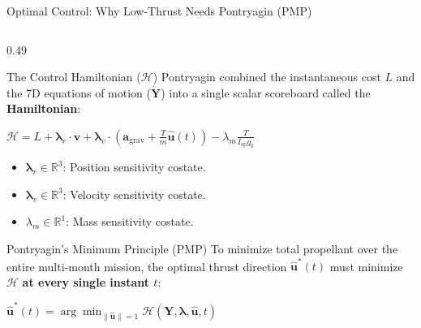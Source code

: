\documentclass[aspectratio=169, 10pt]{beamer}
\begin{document}
\begin{frame}{Optimal Control: Why Low-Thrust Needs Pontryagin (PMP)}
\begin{columns}[T]
        \begin{column}{0.49\textwidth}
            \begin{block}{The Control Hamiltonian ($\mathcal{H}$)}
                \scriptsize
                Pontryagin combined the instantaneous cost $L$ and the 7D equations of motion ($\dot{\mathbf{Y}}$) into a single scalar scoreboard called the \textbf{Hamiltonian}:
                \par\vspace{2pt}
                {\centering $\displaystyle \mathcal{H} = L + \boldsymbol{\lambda}_r \cdot \mathbf{v} + \boldsymbol{\lambda}_v \cdot \left(\mathbf{a}_{\text{grav}} + \frac{T}{m}\hat{\mathbf{u}}(t)\right) - \lambda_m \frac{T}{I_{\text{sp}} g_0}$ \par}
                \vspace{2pt}
                \begin{itemize}\setlength{\itemsep}{1.2pt}\setlength{\topsep}{0pt}
                    \item $\boldsymbol{\lambda}_r \in \mathbb{R}^3$: Position sensitivity costate.
                    \item $\boldsymbol{\lambda}_v \in \mathbb{R}^3$: Velocity sensitivity costate.
                    \item $\lambda_m \in \mathbb{R}^1$: Mass sensitivity costate.
                \end{itemize}
            \end{block}
            \vspace{-0.15cm}
            \begin{alertblock}{Pontryagin's Minimum Principle (PMP)}
                \scriptsize
                To minimize total propellant over the entire multi-month mission, the optimal thrust direction $\hat{\mathbf{u}}^*(t)$ must minimize $\mathcal{H}$ \textbf{at every single instant $t$}:
                \par\vspace{1pt}
                {\centering $\displaystyle \hat{\mathbf{u}}^*(t) = \arg\min_{\|\hat{\mathbf{u}}\|=1} \mathcal{H}(\mathbf{Y}, \boldsymbol{\lambda}, \hat{\mathbf{u}}, t)$ \par}
            \end{alertblock}
        \end{column}
    \end{columns}
\end{frame}
\end{document}
